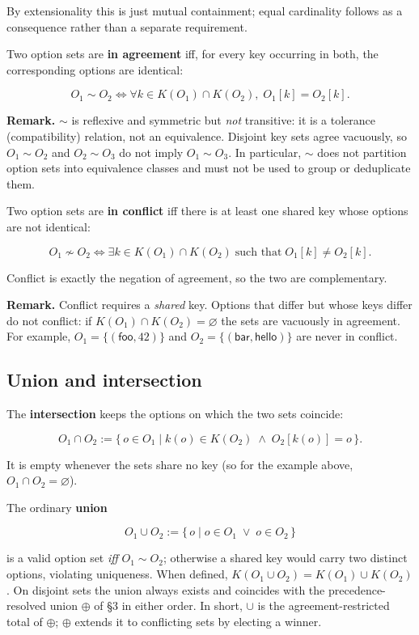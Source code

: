 \documentclass[11pt]{article}
\begin{document}
By extensionality this is just mutual containment; equal cardinality follows as a consequence rather than a separate requirement.

Two option sets are \textbf{in agreement} iff, for every key occurring in both, the corresponding options are identical:

\[
O_1 \sim O_2
\Longleftrightarrow
\forall k \in K(O_1) \cap K(O_2),\; O_1[k] = O_2[k].
\]

\textbf{Remark.} \(\sim\) is reflexive and symmetric but \emph{not} transitive: it is a tolerance (compatibility) relation, not an equivalence. Disjoint key sets agree vacuously, so \(O_1 \sim O_2\) and \(O_2 \sim O_3\) do not imply \(O_1 \sim O_3\). In particular, \(\sim\) does not partition option sets into equivalence classes and must not be used to group or deduplicate them.

Two option sets are \textbf{in conflict} iff there is at least one shared key whose options are not identical:

\[
O_1 \not\sim O_2
\Longleftrightarrow
\exists k \in K(O_1) \cap K(O_2)\; \text{such that}\; O_1[k] \neq O_2[k].
\]

Conflict is exactly the negation of agreement, so the two are complementary.

\textbf{Remark.} Conflict requires a \emph{shared} key. Options that differ but whose keys differ do not conflict: if \(K(O_1) \cap K(O_2) = \varnothing\) the sets are vacuously in agreement. For example, \(O_1 = \{(\mathsf{foo}, 42)\}\) and \(O_2 = \{(\mathsf{bar}, \mathsf{hello})\}\) are never in conflict.

\subsection*{Union and intersection}

The \textbf{intersection} keeps the options on which the two sets coincide:

\[
O_1 \cap O_2 := \{\, o \in O_1 \mid k(o) \in K(O_2) \;\wedge\; O_2[k(o)] = o \,\}.
\]

It is empty whenever the sets share no key (so for the example above, \(O_1 \cap O_2 = \varnothing\)).

The ordinary \textbf{union}

\[
O_1 \cup O_2 := \{\, o \mid o \in O_1 \;\vee\; o \in O_2 \,\}
\]

is a valid option set \emph{iff} \(O_1 \sim O_2\); otherwise a shared key would carry two distinct options, violating uniqueness. When defined, \(K(O_1 \cup O_2) = K(O_1) \cup K(O_2)\). On disjoint sets the union always exists and coincides with the precedence-resolved union \(\oplus\) of \S3 in either order. In short, \(\cup\) is the agreement-restricted total of \(\oplus\); \(\oplus\) extends it to conflicting sets by electing a winner.
\end{document}

